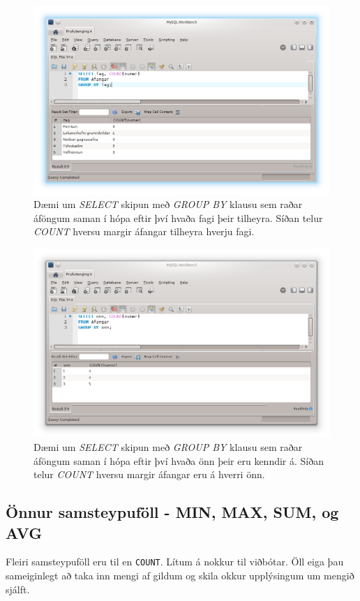\begin{figure}
\caption[GROUP BY og COUNT eftir fögum]{Dæmi um \emph{SELECT} skipun með \emph{GROUP BY} klausu sem raðar áföngum saman í hópa eftir því hvaða fagi þeir tilheyra. Síðan telur \emph{COUNT} hversu margir áfangar tilheyra hverju fagi.}
\label{mynd:workbench-group-by}
\centering
\includegraphics[width=\linewidth]{myndir/workbench-group-by}
\end{figure}

\begin{figure}
\caption[GROUP BY og COUNT eftir önnum]{Dæmi um \emph{SELECT} skipun með \emph{GROUP BY} klausu sem raðar áföngum saman í hópa eftir því hvaða önn þeir eru kenndir á. Síðan telur \emph{COUNT} hversu margir áfangar eru á hverri önn.}
\label{mynd:workbench-group-by-onn}
\centering
\includegraphics[width=\linewidth]{myndir/workbench-group-by-onn}
\end{figure}

\subsection{Önnur samsteypuföll - MIN, MAX, SUM, og AVG}
Fleiri samsteypuföll eru til en \verb|COUNT|. Lítum á nokkur til viðbótar. Öll eiga þau sameiginlegt að taka inn mengi af gildum og skila okkur upplýsingum um mengið sjálft.

